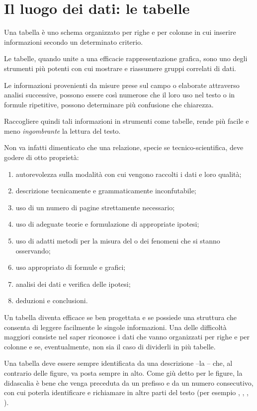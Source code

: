 					\section{Il luogo dei dati: le tabelle}

Una tabella è uno schema organizzato per righe e per colonne in cui inserire informazioni secondo un determinato criterio.

Le tabelle, quando unite a una efficacie rappresentazione grafica, sono uno degli strumenti più potenti con cui mostrare e riassumere gruppi correlati di dati.

Le informazioni provenienti da misure prese sul campo o elaborate attraverso analisi successive, possono essere così numerose che il loro uso nel testo o in formule ripetitive, possono determinare più confusione che chiarezza.

Raccogliere quindi tali informazioni in strumenti come tabelle, rende più facile e meno \textit{ingombrante} la lettura del testo.

Non va infatti dimenticato che una relazione, specie se tecnico-scientifica, deve godere di otto proprietà:
\begin{enumerate}
 \item autorevolezza sulla modalità con cui vengono raccolti i dati e loro qualità;
 \item descrizione tecnicamente e grammaticamente inconfutabile;
 \item uso di un numero di pagine strettamente necessario;
 \item uso di adeguate teorie e formulazione di appropriate ipotesi;
 \item uso di adatti metodi per la misura del o dei fenomeni che si stanno osservando;
 \item uso appropriato di formule e grafici;
 \item analisi dei dati e verifica delle ipotesi;
 \item deduzioni e conclusioni.
\end{enumerate}

Un tabella diventa efficace se ben progettata e se possiede una struttura che consenta di leggere facilmente le singole informazioni. Una delle difficoltà maggiori consiste nel saper riconosce i dati che vanno organizzati per righe e per colonne e se, eventualmente, non sia il caso di dividerli in più tabelle.

Una tabella deve essere sempre identificata da una descrizione --la -- che, al contrario delle figure, va posta sempre in alto. Come giù detto per le figure, la didascalia è bene che venga preceduta da un prefisso e da un numero consecutivo, con cui poterla identificare e richiamare in altre parti del testo (per esempio , , , \ecc).


